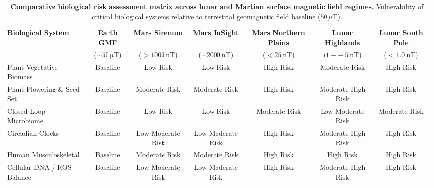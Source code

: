 \begin{table}[t]
\centering
\scriptsize
\caption{\textbf{Comparative biological risk assessment matrix across lunar and Martian surface magnetic field regimes.} Vulnerability of critical biological systems relative to terrestrial geomagnetic field baseline ($50\,\mu\text{T}$).}
\label{tab:unified_risk_matrix}
\begin{tabular}{p{3.2cm}cccccc}
\toprule
\textbf{Biological System} & \textbf{Earth GMF} & \textbf{Mars Sirenum} & \textbf{Mars InSight} & \textbf{Mars Northern Plains} & \textbf{Lunar Highlands} & \textbf{Lunar South Pole} \\
 & ($\sim\SI{50}{\micro\tesla}$) & ($>\SI{1000}{\nano\tesla}$) & ($\sim\SI{2000}{\nano\tesla}$) & ($<\SI{25}{\nano\tesla}$) & ($\SI{1}{--}\SI{5}{\nano\tesla}$) & ($<\SI{1.0}{\nano\tesla}$) \\
\midrule
Plant Vegetative Biomass & Baseline & Low Risk & Low Risk & High Risk & Moderate Risk & High Risk \\
Plant Flowering \& Seed Set & Baseline & Moderate Risk & Moderate Risk & High Risk & Moderate-High Risk & High Risk \\
Closed-Loop Microbiome & Baseline & Low Risk & Low Risk & Moderate Risk & Low-Moderate Risk & Moderate Risk \\
Circadian Clocks & Baseline & Low-Moderate Risk & Low-Moderate Risk & High Risk & Moderate-High Risk & High Risk \\
Human Musculoskeletal & Baseline & Moderate Risk & Moderate Risk & High Risk & High Risk & High Risk \\
Cellular DNA / ROS Balance & Baseline & Low-Moderate Risk & Low-Moderate Risk & High Risk & Moderate-High Risk & High Risk \\
\bottomrule
\end{tabular}
\end{table}
